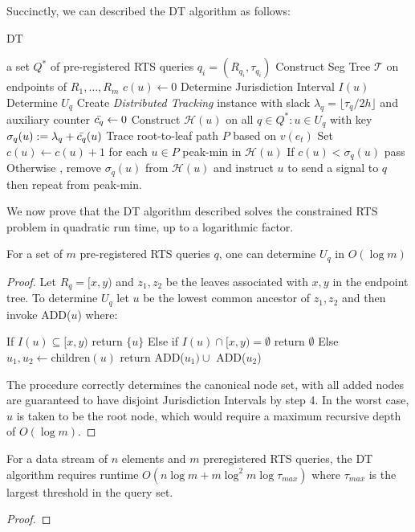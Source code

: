 Succinctly, we can described the DT algorithm as follows: 
\begin{algorithm}
\caption{DT }\label{Algorithm 2}
\begin{algorithmic}
\Require a set $Q^*$ of pre-registered RTS queries $q_i = (R_{q_i}, \tau_{q_i})$
\State Construct Seg Tree $\mathcal{T}$ on endpoints of $R_1, \dots, R_m$
    \State $c(u)\gets 0$
    \State Determine Jurisdiction Interval $I(u)$
\EndFor
{}
    \State Determine $U_q$
    \State Create \textit{Distributed Tracking} instance with slack $\lambda_q = \lfloor \tau_q/2h\rfloor$ and auxiliary counter $\Bar{c_q}\gets0$
\EndFor
{}
    \State Construct $\mathcal{H}(u)$ on all $q\in Q^* : u\in U_q$ with key $\sigma_q(u) := \lambda_q + \Bar{c_q}(u)$
\EndFor
{}
    \State Trace root-to-leaf path $P$ based on $v(e_t)$
    \State Set $c(u) \gets c(u)+1$ for each $u\in P$
        \State peak-min in $\mathcal{H}(u)$
        \State If $c(u) < \sigma_q(u)$ pass
        \State Otherwise , remove $\sigma_q(u)$ from $\mathcal{H}(u)$ and instruct $u$ to send a signal to $q$ then repeat from peak-min.
    \EndFor
\EndFor
\end{algorithmic}
\end{algorithm}
We now prove that the DT algorithm described solves the constrained RTS problem in quadratic run time, up to a logarithmic factor.

\begin{lemma}
    For a set of $m$ pre-registered RTS queries $q$, one can determine $U_q$ in $O(\log m)$ 
\end{lemma}
\begin{proof}
    Let $R_q = [x,y)$ and $z_1, z_2$ be the leaves associated with $x, y$ in the endpoint tree. To determine $U_{q}$ let $u$ be the lowest common ancestor of $z_1, z_2$ and then invoke ADD($u$) where:
    \begin{algorithmic}[1]
        \State If $I(u)\subseteq[x,y)$ return $\{u\}$
        \State Else if $I(u)\cap[x,y) = \emptyset$ return $\emptyset$
        \State Else $u_1, u_2 \gets \text{children}(u)$ return ADD($u_1) \cup $ ADD($u_2$)
    \EndProcedure
    \end{algorithmic}
    The procedure correctly determines the canonical node set, with all added nodes are guaranteed to have disjoint Jurisdiction Intervals by step 4. In the worst case, $u$ is taken to be the root node, which would require a maximum recursive depth of $O(\log m)$. 
\end{proof}

\begin{theorem} For a data stream of $n$ elements and $m$ preregistered RTS queries, the DT algorithm requires runtime $O(n\log m + m\log^2m\log \tau_{max})$ where $\tau_{max}$ is the largest threshold in the query set. 
\end{theorem}
\begin{proof}
    
\end{proof}